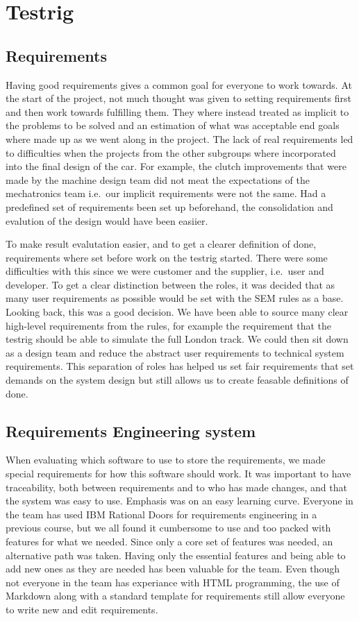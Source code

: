 \section{Testrig}
\subsection{Requirements}
Having good requirements gives a common goal for everyone to work towards. At
the start of the project, not much thought was given to setting requirements
first and then work towards fulfilling them. They where instead treated as
implicit to the problems to be solved and an estimation of what was acceptable
end goals where made up as we went along in the project. The lack of real
requirements led to difficulties when the projects from the other subgroups
where incorporated into the final design of the car. For example, the clutch
improvements that were made by the machine design team did not meat the
expectations of the mechatronics team i.e.\ our implicit requirements were not
the same. Had a predefined set of requirements been set up beforehand, the
consolidation and evalution of the design would have been easiier.

To make result evalutation easier, and to get a clearer definition of done,
requirements where set before work on the testrig started. There were some
difficulties with this since we were customer and the supplier, i.e.\ user and
developer. To get a clear distinction between the roles, it was decided that as
many user requirements as possible would be set with the SEM rules as a base.
Looking back, this was a good decision. We have been able to source many clear
high-level requirements from the rules, for example the requirement that the
testrig should be able to simulate the full London track. We could then sit down
as a design team and reduce the abstract user requirements to technical system
requirements. This separation of roles has helped us set fair requirements that
set demands on the system design but still allows us to create feasable
definitions of done. 

\subsection{Requirements Engineering system}
When evaluating which software to use to store the requirements, we made
special requirements for how this software should work. It was important to have
traceability, both between requirements and to who has made changes, and that
the system was easy to use. Emphasis was on an easy learning curve. Everyone in
the team has used IBM Rational Doors for requirements engineering in a previous
course, but we all found it cumbersome to use and too packed with features for
what we needed. Since only a core set of features was needed, an alternative
path was taken. Having only the essential features and being able to add new
ones as they are needed has been valuable for the team. Even though not everyone
in the team has experiance with HTML programming, the use of Markdown along with
a standard template for requirements still allow everyone to write new and edit
requirements. 

